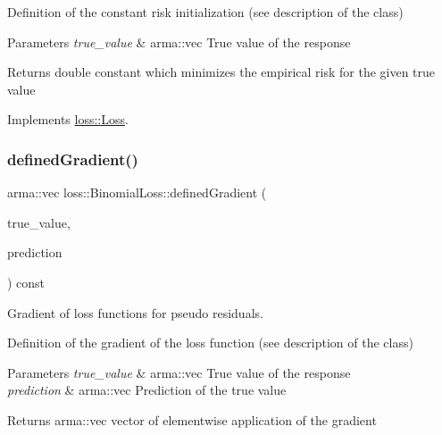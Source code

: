 Definition of the constant risk initialization (see description of the class)


\begin{DoxyParams}{Parameters}
{\em true\+\_\+value} & {\ttfamily arma\+::vec} True value of the response\\
\hline
\end{DoxyParams}
\begin{DoxyReturn}{Returns}
{\ttfamily double} constant which minimizes the empirical risk for the given true value 
\end{DoxyReturn}


Implements \mbox{\hyperlink{classloss_1_1_loss_a65fe7dcd9370e6a549b8d1cc95fc8798}{loss\+::\+Loss}}.

\mbox{\label{classloss_1_1_binomial_loss_a47a27e1be3e7f2c275046b42557ca21a}} 
\subsubsection{\texorpdfstring{defined\+Gradient()}{definedGradient()}}
{\footnotesize\ttfamily arma\+::vec loss\+::\+Binomial\+Loss\+::defined\+Gradient (\begin{DoxyParamCaption}\item[{const arma\+::vec \&}]{true\+\_\+value,  }\item[{const arma\+::vec \&}]{prediction }\end{DoxyParamCaption}) const\hspace{0.3cm}{\ttfamily [virtual]}}



Gradient of loss functions for pseudo residuals. 

Definition of the gradient of the loss function (see description of the class)


\begin{DoxyParams}{Parameters}
{\em true\+\_\+value} & {\ttfamily arma\+::vec} True value of the response \\
\hline
{\em prediction} & {\ttfamily arma\+::vec} Prediction of the true value\\
\hline
\end{DoxyParams}
\begin{DoxyReturn}{Returns}
{\ttfamily arma\+::vec} vector of elementwise application of the gradient 
\end{DoxyReturn}


